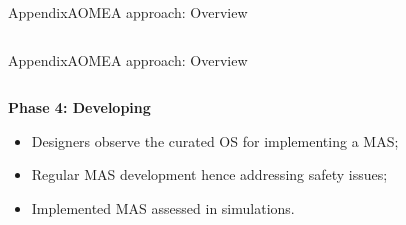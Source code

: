 \begin{frame}{Appendix}{AOMEA approach: Overview}
\begin{columns}
    \end{columns}

\end{frame}

\begin{frame}{Appendix}{AOMEA approach: Overview}

    \begin{columns}

        \begin{column}{0.6\textwidth}

            \textbf{Phase 4: Developing}

            \begin{itemize}
                \item Designers observe the curated OS for implementing a MAS;
                \item Regular MAS development hence addressing safety issues;
                \item Implemented MAS assessed in simulations.
            \end{itemize}

        \end{column}


\end{columns}
\end{frame}
